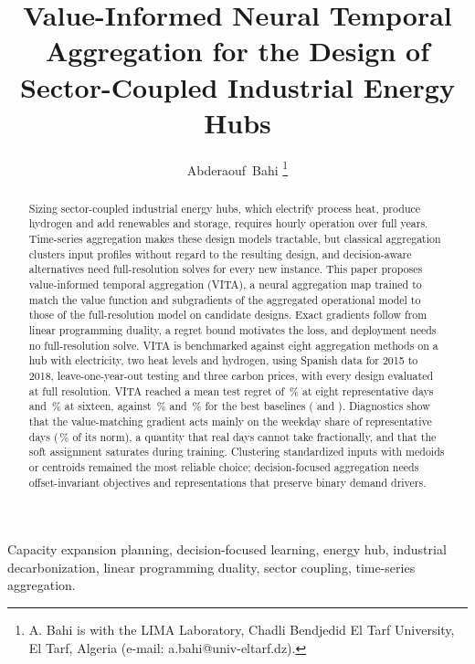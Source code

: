 \documentclass[journal]{IEEEtran}
\begin{document}
\title{Value-Informed Neural Temporal Aggregation for the Design of Sector-Coupled Industrial Energy Hubs}
\author{Abderaouf~Bahi%
\thanks{A. Bahi is with the LIMA Laboratory, Chadli Bendjedid El Tarf University, El Tarf, Algeria (e-mail: a.bahi@univ-eltarf.dz).}}
\maketitle
\begin{abstract}
Sizing sector-coupled industrial energy hubs, which electrify process heat, produce hydrogen and add renewables and storage, requires hourly operation over full years. Time-series aggregation makes these design models tractable, but classical aggregation clusters input profiles without regard to the resulting design, and decision-aware alternatives need full-resolution solves for every new instance. This paper proposes value-informed temporal aggregation (VITA), a neural aggregation map trained to match the value function and subgradients of the aggregated operational model to those of the full-resolution model on candidate designs. Exact gradients follow from linear programming duality, a regret bound motivates the loss, and deployment needs no full-resolution solve. VITA is benchmarked against eight aggregation methods on a hub with electricity, two heat levels and hydrogen, using Spanish data for 2015 to 2018, leave-one-year-out testing and three carbon prices, with every design evaluated at full resolution. VITA reached a mean test regret of \RegVITAKeight\,\% at eight representative days and \RegVITAKsixteen\,\% at sixteen, against \RegBestBaseKeight\,\% and \RegBestBaseKsixteen\,\% for the best baselines (\BestBaseNameKeight{} and \BestBaseNameKsixteen{}). Diagnostics show that the value-matching gradient acts mainly on the weekday share of representative days (\GradShareWeekday\,\% of its norm), a quantity that real days cannot take fractionally, and that the soft assignment saturates during training. Clustering standardized inputs with medoids or centroids remained the most reliable choice; decision-focused aggregation needs offset-invariant objectives and representations that preserve binary demand drivers.
\end{abstract}

\begin{IEEEkeywords}
Capacity expansion planning, decision-focused learning, energy hub, industrial decarbonization, linear programming duality, sector coupling, time-series aggregation.
\end{IEEEkeywords}
\end{document}
